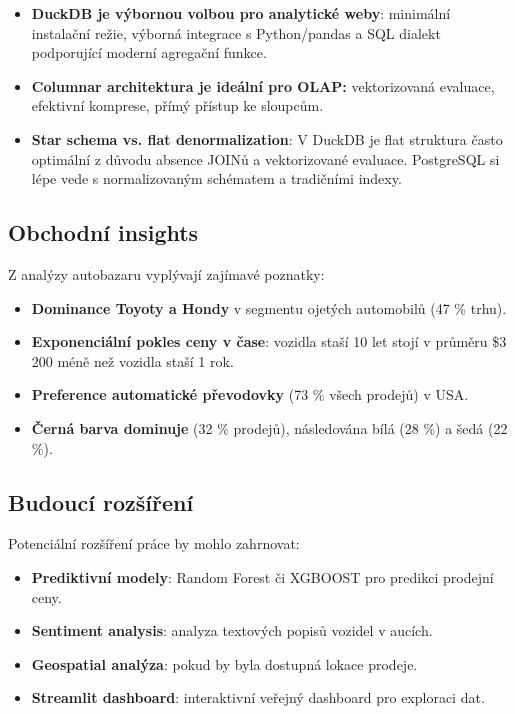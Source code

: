 \documentclass[12pt,a4paper]{article}
\begin{document}
\begin{itemize}
    \item \textbf{DuckDB je výbornou volbou pro analytické weby}: minimální instalační
          režie, výborná integrace s Python/pandas a SQL dialekt podporující moderní
          agregační funkce.
    
    \item \textbf{Columnar architektura je ideální pro OLAP:} vektorizovaná evaluace,
          efektivní komprese, přímý přístup ke sloupcům.
    
    \item \textbf{Star schema vs. flat denormalization}: V DuckDB je flat struktura
          často optimální z důvodu absence JOINů a vektorizované evaluace. PostgreSQL
          si lépe vede s normalizovaným schématem a tradičními indexy.
\end{itemize}

\subsection{Obchodní insights}

Z analýzy autobazaru vyplývají zajímavé poznatky:

\begin{itemize}
    \item \textbf{Dominance Toyoty a Hondy} v segmentu ojetých automobilů (47 \% trhu).
    \item \textbf{Exponenciální pokles ceny v čase}: vozidla staší 10 let stojí v průměru
          \$3\,200 méně než vozidla staší 1 rok.
    \item \textbf{Preference automatické převodovky} (73 \% všech prodejů) v USA.
    \item \textbf{Černá barva dominuje} (32 \% prodejů), následována bílá (28 \%) a šedá (22 \%).
\end{itemize}

\subsection{Budoucí rozšíření}

Potenciální rozšíření práce by mohlo zahrnovat:

\begin{itemize}
    \item \textbf{Prediktivní modely}: Random Forest či XGBOOST pro predikci prodejní ceny.
    \item \textbf{Sentiment analysis}: analyza textových popisů vozidel v aucích.
    \item \textbf{Geospatial analýza}: pokud by byla dostupná lokace prodeje.
    \item \textbf{Streamlit dashboard}: interaktivní veřejný dashboard pro exploraci dat.
\end{itemize}
\end{document}
